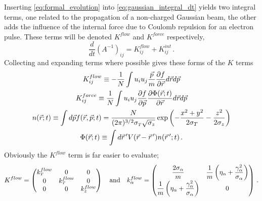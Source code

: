 Inserting \ref{eq:formal_evolution} into \ref{eq:gaussian_integral_dt} yields two integral terms, one related to the propagation of a non-charged Gaussian beam, the other adds the influence of the internal force due to Coulomb repulsion for an electron pulse.
These terms will be denoted $K^{flow}$ and $K^{force}$ respectively, 
\begin{equation} \label{eq:gaussian_integral_dt_k}
  \frac{d}{dt}(A^{-1})_{ij} = K^{flow}_{ij} + K^{int}_{ij} \,\text{.}
\end{equation}
Collecting and expanding terms where possible gives these forms of the $K$ terms
\begin{gather}
  K^{flow}_{ij} \equiv -\frac{1}{N} \int u_i u_j \frac{\vec{p}}{m} \frac{\partial f}{\partial \vec{r}} d\vec{r} d\vec{p} \\
  \label{eq:Kforce}
  K^{force}_{ij} \equiv \frac{1}{N} \int u_i u_j \frac{\partial f}{\partial \vec{p}} \frac{\partial \Phi(\vec{r};t)}{\partial \vec{r}} d\vec{r} d\vec{p} \\
  n(\vec{r};t) \equiv \int d\vec{p} f(\vec{r},\vec{p};t) 
    = \frac{N}{(2\pi)^{3/2} \sigma_{{\scriptscriptstyle T}} \sqrt{\sigma_{z}}} \exp \left( -\frac{x^2+y^2}{2\sigma_{T}} - \frac{z^2}{2\sigma_{z}} \right) \\
    \label{eq:potential_integral}
    \Phi(\vec{r};t) \equiv \int d\vec{r}\,^{\prime} V(\vec{r} - \vec{r}\,^{\prime}) n(\vec{r}\,^{\prime}; t) \,\text{.}
\end{gather}
Obviously the $K^{flow}$ term is far easier to evaluate;
\begin{equation}
  K^{flow} = 
  \begin{pmatrix}
    k^{flow}_{{\scriptscriptstyle T}} & 0 & 0 \\
    0 & k^{flow}_{{\scriptscriptstyle T}} & 0 \\
    0 & 0 & k^{flow}_{z}
  \end{pmatrix}
  \quad \text{and} \quad
  k^{flow}_{\alpha} = 
  \begin{pmatrix}
    \dfrac{2\sigma_{\alpha}}{m} & \dfrac{1}{m} \left(\eta_{\alpha} + \dfrac{\gamma_{\alpha}^2}{\sigma_{\alpha}} \right) \\
    \dfrac{1}{m} \left(\eta_{\alpha} + \dfrac{\gamma_{\alpha}^2}{\sigma_{\alpha}} \right) & 0
  \end{pmatrix} \,\text{.}
\end{equation}

